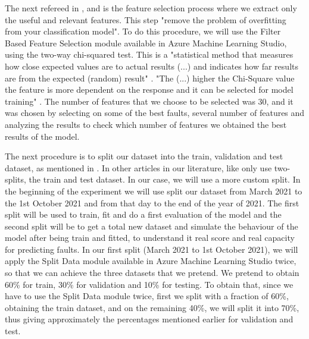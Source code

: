 
The next refereed in \cite{ML_Data_processing}, \cite{N_4_WIND} and \cite{39_WIND} is the feature selection process where we extract only the useful and relevant features. This step "remove the problem of overfitting from your classification model". To do this procedure, we will use the Filter Based Feature Selection module available in Azure Machine Learning Studio, using the two-way chi-squared test. This is a "statistical method that measures how close expected values are to actual results (...) and indicates how far results are from the expected (random) result" \cite{AZURE_MACHINE_LEARNING}. "The (...) higher the Chi-Square value the feature is more dependent on the response and it can be selected for model training" \cite{TDC_ChiSquared}. The number of features that we choose to be selected was 30, and it was chosen by selecting on some of the best faults, several number of features and analyzing the results to check which number of features we obtained the best results of the model.

The next procedure is to split our dataset into the train, validation and test dataset, as mentioned in \cite{TDC_Train_Test_Split} \cite{TDC_TrainValidationTest}. In other articles in our literature, like \cite{Machine_Learning_Mistery_Train-Test-Split} \cite{ML_Data_processing} \cite{N_4_WIND} \cite{41_WIND} only use two-splits, the train and test dataset.
In our case, we will use a more custom split. In the beginning of the experiment we will use split our dataset from March 2021 to the 1st October 2021 and from that day to the end of the year of 2021. The first split will be used to train, fit and do a first evaluation of the model and the second split will be to get a total new dataset and simulate the behaviour of the model after being train and fitted, to understand it real score and real capacity for predicting faults.
In our first split (March 2021 to 1st October 2021), we will apply the Split Data module available in Azure Machine Learning Studio twice, so that we can achieve the three datasets that we pretend. We pretend to obtain 60\% for train, 30\% for validation and 10\% for testing. To obtain that, since we have to use the Split Data module twice, first we split with a fraction of 60\%, obtaining the train dataset, and on the remaining 40\%, we will split it into 70\%, thus giving approximately the percentages mentioned earlier for validation and test.

